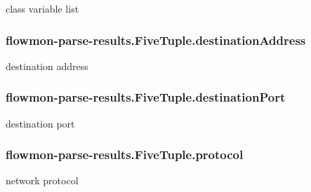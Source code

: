class variable list 

\subsubsection[{\texorpdfstring{destination\+Address}{destinationAddress}}]{\setlength{\rightskip}{0pt plus 5cm}flowmon-\/parse-\/results.\+Five\+Tuple.\+destination\+Address}\hypertarget{classflowmon-parse-results_1_1FiveTuple_acaa5a4c497bc04e7429e2e30bb5d2da9}{}\label{classflowmon-parse-results_1_1FiveTuple_acaa5a4c497bc04e7429e2e30bb5d2da9}


destination address 

\subsubsection[{\texorpdfstring{destination\+Port}{destinationPort}}]{\setlength{\rightskip}{0pt plus 5cm}flowmon-\/parse-\/results.\+Five\+Tuple.\+destination\+Port}\hypertarget{classflowmon-parse-results_1_1FiveTuple_abe1d2214f245803c973729bc0ea1b3bb}{}\label{classflowmon-parse-results_1_1FiveTuple_abe1d2214f245803c973729bc0ea1b3bb}


destination port 

\subsubsection[{\texorpdfstring{protocol}{protocol}}]{\setlength{\rightskip}{0pt plus 5cm}flowmon-\/parse-\/results.\+Five\+Tuple.\+protocol}\hypertarget{classflowmon-parse-results_1_1FiveTuple_a4ed085c9485449c66a351839a0397a23}{}\label{classflowmon-parse-results_1_1FiveTuple_a4ed085c9485449c66a351839a0397a23}


network protocol 

